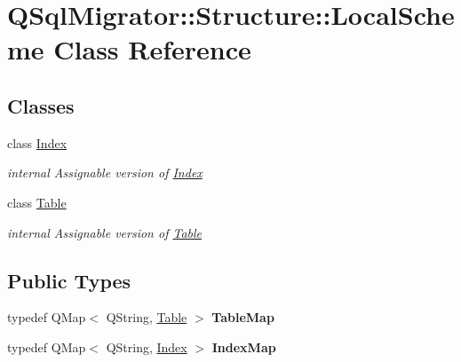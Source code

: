 \hypertarget{class_q_sql_migrator_1_1_structure_1_1_local_scheme}{}\section{Q\+Sql\+Migrator\+:\+:Structure\+:\+:Local\+Scheme Class Reference}
\label{class_q_sql_migrator_1_1_structure_1_1_local_scheme}
\subsection*{Classes}
\begin{DoxyCompactItemize}
\item 
class \hyperlink{class_q_sql_migrator_1_1_structure_1_1_local_scheme_1_1_index}{Index}
\begin{DoxyCompactList}\small\item\em internal Assignable version of \hyperlink{class_q_sql_migrator_1_1_structure_1_1_local_scheme_1_1_index}{Index} \end{DoxyCompactList}\item 
class \hyperlink{class_q_sql_migrator_1_1_structure_1_1_local_scheme_1_1_table}{Table}
\begin{DoxyCompactList}\small\item\em internal Assignable version of \hyperlink{class_q_sql_migrator_1_1_structure_1_1_local_scheme_1_1_table}{Table} \end{DoxyCompactList}\end{DoxyCompactItemize}
\subsection*{Public Types}
\begin{DoxyCompactItemize}
\item 
\mbox{\label{class_q_sql_migrator_1_1_structure_1_1_local_scheme_aa7518476ea01d040a4a1169b905e1e54}} 
typedef Q\+Map$<$ Q\+String, \hyperlink{class_q_sql_migrator_1_1_structure_1_1_local_scheme_1_1_table}{Table} $>$ {\bfseries Table\+Map}
\item 
\mbox{\label{class_q_sql_migrator_1_1_structure_1_1_local_scheme_a9f310a48cf0d9c54ce28c0f3a4fe6acb}} 
typedef Q\+Map$<$ Q\+String, \hyperlink{class_q_sql_migrator_1_1_structure_1_1_local_scheme_1_1_index}{Index} $>$ {\bfseries Index\+Map}
\end{DoxyCompactItemize}

